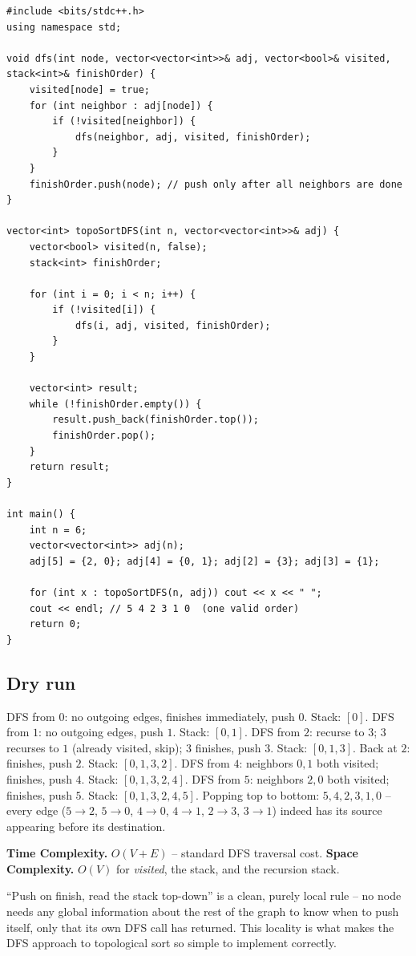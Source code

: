 \begin{lstlisting}
#include <bits/stdc++.h>
using namespace std;

void dfs(int node, vector<vector<int>>& adj, vector<bool>& visited, stack<int>& finishOrder) {
    visited[node] = true;
    for (int neighbor : adj[node]) {
        if (!visited[neighbor]) {
            dfs(neighbor, adj, visited, finishOrder);
        }
    }
    finishOrder.push(node); // push only after all neighbors are done
}

vector<int> topoSortDFS(int n, vector<vector<int>>& adj) {
    vector<bool> visited(n, false);
    stack<int> finishOrder;

    for (int i = 0; i < n; i++) {
        if (!visited[i]) {
            dfs(i, adj, visited, finishOrder);
        }
    }

    vector<int> result;
    while (!finishOrder.empty()) {
        result.push_back(finishOrder.top());
        finishOrder.pop();
    }
    return result;
}

int main() {
    int n = 6;
    vector<vector<int>> adj(n);
    adj[5] = {2, 0}; adj[4] = {0, 1}; adj[2] = {3}; adj[3] = {1};

    for (int x : topoSortDFS(n, adj)) cout << x << " ";
    cout << endl; // 5 4 2 3 1 0  (one valid order)
    return 0;
}
\end{lstlisting}

\subsection*{Dry run}


DFS from $0$: no outgoing edges, finishes immediately, push $0$.
Stack: $[0]$. DFS from $1$: no outgoing edges, push $1$. Stack:
$[0,1]$. DFS from $2$: recurse to $3$; $3$ recurses to $1$ (already
visited, skip); $3$ finishes, push $3$. Stack: $[0,1,3]$. Back at $2$:
finishes, push $2$. Stack: $[0,1,3,2]$. DFS from $4$: neighbors $0,1$
both visited; finishes, push $4$. Stack: $[0,1,3,2,4]$. DFS from $5$:
neighbors $2,0$ both visited; finishes, push $5$. Stack:
$[0,1,3,2,4,5]$. Popping top to bottom: $5,4,2,3,1,0$ -- every edge
($5{\to}2$, $5{\to}0$, $4{\to}0$, $4{\to}1$, $2{\to}3$, $3{\to}1$)
indeed has its source appearing before its destination.

\begin{complexitybox}
\textbf{Time Complexity.} $O(V+E)$ -- standard DFS traversal cost.
\textbf{Space Complexity.} $O(V)$ for \textit{visited}, the stack, and
the recursion stack.
\end{complexitybox}

\begin{takeawaybox}
``Push on finish, read the stack top-down'' is a clean, purely local
rule -- no node needs any global information about the rest of the
graph to know when to push itself, only that its own DFS call has
returned. This locality is what makes the DFS approach to topological
sort so simple to implement correctly.
\end{takeawaybox}

